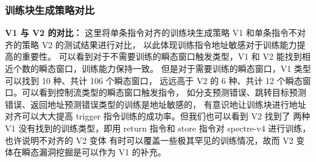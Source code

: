 \begin{table}[h!]
    \begin{center} 
    \caption{V3 瞬态窗口统计} 
    \label{table:v3-trans}  
    \end{center}
\end{table}

\subsubsection{训练块生成策略对比}

\textbf{V1 与 V2 的对比：}
这里将单条指令对齐的训练块生成策略 V1 和单条指令不对齐的策略 V2 的测试结果进行对比，
以此体现训练指令地址敏感对于训练能力提高的重要性。
可以看到对于不需要训练的瞬态窗口触发类型，V1 和 V2 能找到相近个数的瞬态窗口，训练能力保持一致。
但是对于需要训练的瞬态窗口，V1 类型可以找到 10 种、共计 106 个瞬态窗口，
远远高于 V2 的 6 种、共计 12 个瞬态窗口。可以看到控制流类型的瞬态窗口触发指令，
如分支预测错误、跳转目标预测错误、返回地址预测错误类型的训练是地址敏感的，
有意识地让训练块进行地址对齐可以大大提高 trigger 指令训练的成功率。但我们也可以看到 V2 找到了
两种 V1 没有找到的训练类型，即用 return 指令和 store 指令对 spectre-v4 进行训练，也许说明不对齐的 V2 变体
有时可以覆盖一些极其罕见的训练情况，故而 V2 变体在瞬态漏洞挖掘是可以作为 V1 的补充。\par

